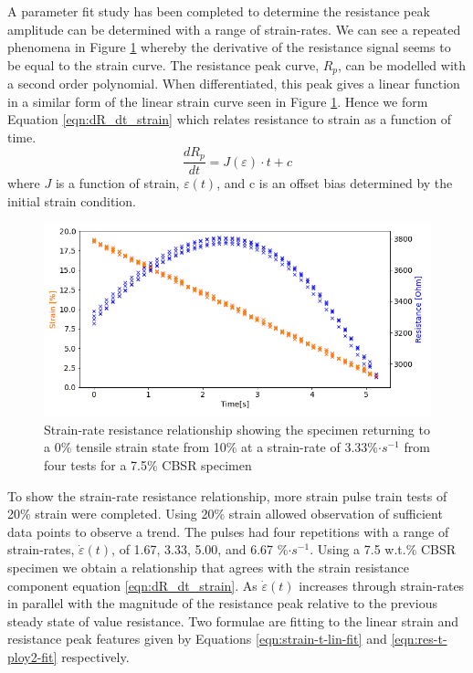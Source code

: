 A parameter fit study has been completed to determine the resistance peak amplitude can be determined with a range of  strain-rates. We can see a repeated phenomena in Figure \ref{fig:poly2_r_strain} whereby the derivative of the resistance signal seems to be equal to the strain curve. The resistance peak curve, $R_p$, can be modelled with a second order polynomial. When differentiated, this peak gives a linear function in a similar form of the linear strain curve seen in Figure \ref{fig:poly2_r_strain}. Hence we form Equation \ref{eqn:dR_dt_strain} which relates resistance to strain as a function of time.
\begin{equation} 
	\frac{dR_p}{dt} = J(\varepsilon) \cdot t + c
	\label{eqn:dR_dt_strain}
\end{equation}
where $J$ is a function of strain, $\varepsilon(t)$, and c is an offset bias determined by the initial strain condition.
\begin{figure}[H]
	\centering
	\includegraphics[width=0.7\linewidth]{Figures/strain_velocity_res_80mms_2_7-5_E4pin_20mm_v11_0.2Strain_velocityprof.png}
	\caption{Strain-rate resistance relationship showing the specimen returning to a 0\% tensile strain state from 10\% at a strain-rate of 3.33\%$\cdot s^{-1}$ from four tests for a 7.5\% CBSR specimen}
	\label{fig:poly2_r_strain}
\end{figure}
To show the strain-rate resistance relationship, more strain pulse train tests of 20\% strain were completed. Using 20\% strain allowed observation of sufficient data points to observe a trend. The pulses had four repetitions with a range of strain-rates, $\dot{\varepsilon}(t)$, of 1.67, 3.33, 5.00, and 6.67 \%${\cdot s^{-1}}$. Using a 7.5 w.t.\% CBSR specimen we obtain a relationship that agrees with the strain resistance component equation \ref{eqn:dR_dt_strain}. As $\dot{\varepsilon}(t)$ increases through strain-rates in parallel with the magnitude of the resistance peak relative to the previous steady state of value resistance. Two formulae are fitting to the linear strain and resistance peak features given by Equations \ref{eqn:strain-t-lin-fit} and \ref{eqn:res-t-ploy2-fit} respectively.
